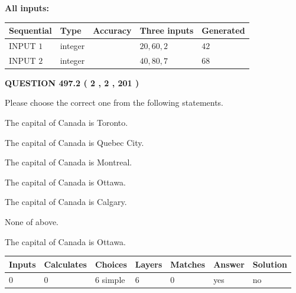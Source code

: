 \documentclass[12pt]{article}
\begin{document}
   
   
   
\noindent\vspace{0.1in}\hspace{-0.08in} {\textbf{\Large{All inputs: }}}
   
   
  
  
\noindent\begin{tabular}{|l|l|l|l|l|}
\hline
 Sequential & Type & Accuracy & Three inputs & Generated \\ 
\hline
 
 
  INPUT $  1 $ & integer &  & $
 20
 , 
 60
 , 
 2
 $ & $ 42 $ 
 \\  \hline  
 
 
  INPUT $  2 $ & integer &  & $
 40
 , 
 80
 , 
 7
 $ & $ 68 $ 
 \\  \hline  
 \end{tabular}
   
   
  
\vspace{0.2in}
  
{\textbf{\Large{QUESTION
497.2 
 ( 2 , 2 , 201 )
}}}
  
  
Please choose the correct one from the following statements.
 
 
The capital of Canada is Toronto.
 
 
The capital of Canada is Quebec City.
 
 
The capital of Canada is Montreal.
 
 
The capital of Canada is Ottawa.
 
 
The capital of Canada is Calgary.
 
 
 None of above.
 
 
\noindent{}
 
 
The capital of Canada is Ottawa.
 
 
\noindent{}
 
 
   
   
   
   
\noindent\begin{tabular}{|l|l|l|l|l|l|l|}
 \hline
Inputs & Calculates & Choices & Layers & Matches & Answer & Solution \\ \hline
 0  & 
 0  & 
 6
  simple  
  & 
 6  & 
 0  & 
  yes & 
  no 
  \\ \hline
 \end{tabular}
   
\end{document}

